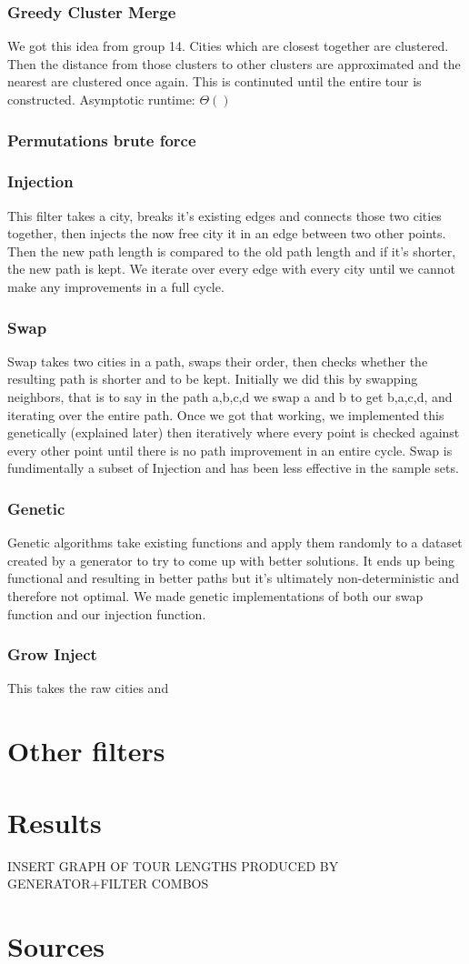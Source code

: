 \documentclass{article}
\begin{document}
\section*{Greedy Cluster Merge}%
We got this idea from group 14. Cities which are closest together are clustered. Then the distance from those clusters to other clusters are approximated and the nearest are clustered once again. This is continuted until the entire tour is constructed. Asymptotic runtime: $\Theta ()$ 
\section*{Permutations brute force}%

\section*{Injection}%
This filter takes a city, breaks it's existing edges and connects those two cities together, then injects the now free city it in an edge between two other points. Then the new path length is compared to the old path length and if it's shorter, the new path is kept. We iterate over every edge with every city until we cannot make any improvements in a full cycle.

\section*{Swap}%
Swap takes two cities in a path, swaps their order, then checks whether the resulting path is shorter and to be kept. Initially we did this by swapping neighbors, that is to say in the path a,b,c,d we swap a and b to get b,a,c,d, and iterating over the entire path. Once we got that working, we implemented this genetically (explained later) then iteratively where every point is checked against every other point until there is no path improvement in an entire cycle. Swap is fundimentally a subset of Injection and has been less effective in the sample sets.

\section*{Genetic}
Genetic algorithms take existing functions and apply them randomly to a dataset created by a generator to try to come up with better solutions. It ends up being functional and resulting in better paths but it's ultimately non-deterministic and therefore not optimal. We made genetic implementations of both our swap function and our injection function.

\section*{Grow Inject}%
This takes the raw cities and 

\part*{Other filters}

\part*{Results}
INSERT GRAPH OF TOUR LENGTHS PRODUCED BY GENERATOR+FILTER COMBOS


\part*{Sources}
\end{document}
